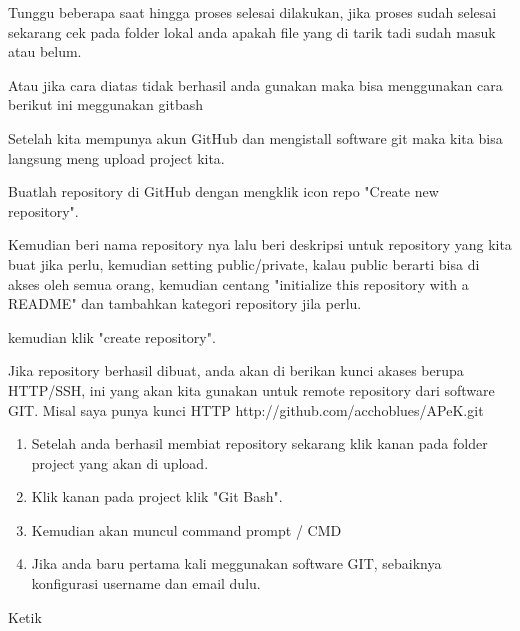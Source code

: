 \vspace{12pt}
\noindent 
Tunggu beberapa saat hingga proses selesai dilakukan, jika proses sudah selesai sekarang cek pada folder lokal anda apakah file yang di tarik tadi sudah masuk atau belum. \par
\vspace{12pt}
\vspace{12pt}
\noindent 
Atau jika cara diatas tidak berhasil anda gunakan maka bisa menggunakan cara berikut ini meggunakan gitbash \par
\vspace{12pt}
\noindent 
Setelah kita mempunya akun GitHub dan mengistall software git maka kita bisa langsung meng upload project kita. \par
\noindent 
Buatlah repository di GitHub dengan mengklik icon repo "Create new repository". \par
\noindent 
Kemudian beri nama repository nya lalu beri deskripsi untuk repository yang kita buat jika perlu, kemudian setting public/private, kalau public berarti bisa di akses oleh semua orang, kemudian centang "initialize this repository with a README" dan tambahkan kategori repository jila perlu. \par
\noindent 
kemudian klik "create repository". \par
\noindent 
Jika repository berhasil dibuat, anda akan di berikan kunci akases berupa HTTP/SSH, ini yang akan kita gunakan untuk remote repository dari software GIT. Misal saya punya kunci HTTP http://github.com/acchoblues/APeK.git \par
\noindent 
\begin{enumerate}
\item Setelah anda berhasil membiat repository sekarang klik kanan pada folder project yang akan di upload. \par
\noindent 
\item Klik kanan pada project klik "Git Bash". \par
\noindent 
\item Kemudian akan muncul command prompt / CMD \par
\noindent 
\item Jika anda baru pertama kali meggunakan software GIT, sebaiknya konfigurasi username dan email dulu. \par
\noindent 
\end {enumerate}
Ketik \par
\noindent 

